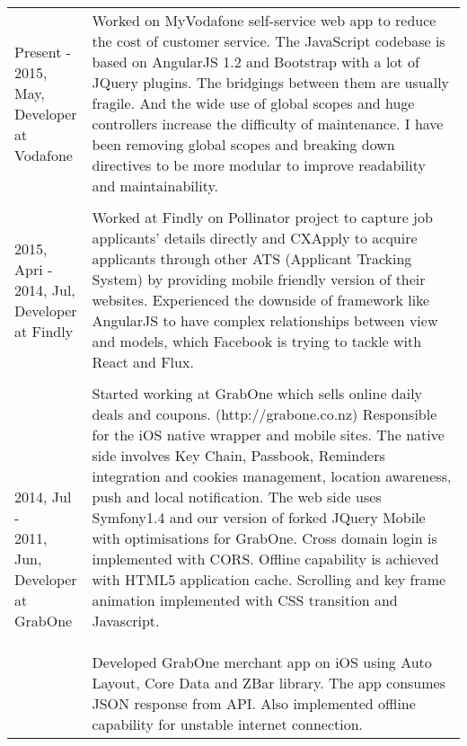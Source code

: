 \begin{resume}
\begin{tabular}{ll}
\parbox[t]{30mm}{Present - \\ 2015, May,\\Developer\\at Vodafone} & \parbox[t]{116mm}{

Worked on MyVodafone self-service web app to reduce the cost of customer service. The JavaScript codebase is based on AngularJS 1.2 and Bootstrap with a lot of JQuery plugins. The bridgings between them are usually fragile. And the wide use of global scopes and huge controllers increase the difficulty of maintenance. I have been removing global scopes and breaking down directives to be more modular to improve readability and maintainability. 

}\\\\
\parbox[t]{30mm}{2015, Apri - \\ 2014, Jul,\\Developer\\at Findly} & \parbox[t]{116mm}{

Worked at Findly on Pollinator project to capture job applicants' details directly and CXApply to acquire applicants through other ATS (Applicant Tracking System) by providing mobile friendly version of their websites. Experienced the downside of framework like AngularJS to have complex relationships between view and models, which Facebook is trying to tackle with React and Flux.

}\\\\
\parbox[t]{30mm}{2014, Jul - \\ 2011, Jun,\\Developer\\at GrabOne} & \parbox[t]{116mm}{

Started working at GrabOne which sells online daily deals and coupons. (http://grabone.co.nz) Responsible for the iOS native wrapper and mobile sites. The native side involves Key Chain, Passbook, Reminders integration and cookies management, location awareness, push and local notification. The web side uses Symfony1.4 and our version of forked JQuery Mobile with optimisations for GrabOne. Cross domain login is implemented with CORS. Offline capability is achieved with HTML5 application cache. Scrolling and key frame animation implemented with CSS transition and Javascript. 
\\\\
Developed GrabOne merchant app on iOS using Auto Layout, Core Data and ZBar library. The app consumes JSON response from API. Also implemented offline capability for unstable internet connection.

}
\end{tabular}
\end{resume}
